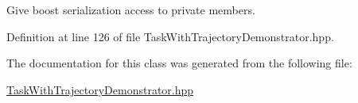 Give boost serialization access to private members. 



Definition at line 126 of file Task\+With\+Trajectory\+Demonstrator.\+hpp.



The documentation for this class was generated from the following file\+:\begin{DoxyCompactItemize}
\item 
\hyperlink{TaskWithTrajectoryDemonstrator_8hpp}{Task\+With\+Trajectory\+Demonstrator.\+hpp}\end{DoxyCompactItemize}
